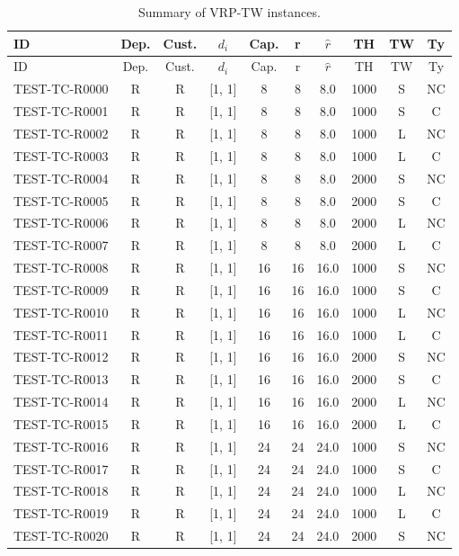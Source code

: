 \begin{longtable}{lccccccccc}
\caption{Summary of VRP-TW instances.} \\
\toprule
ID & Dep. & Cust. & $d_i$ & Cap. & r & $\hat{r}$ & TH & TW & Ty \\
\midrule
\endfirsthead
\toprule
ID & Dep. & Cust. & $d_i$ & Cap. & r & $\hat{r}$ & TH & TW & Ty \\
\midrule
\endhead
\bottomrule
\endfoot
\bottomrule
\endlastfoot
TEST-TC-R0000 & R & R & [1, 1] & 8 & 8 & 8.0 & 1000 & S & NC \\
TEST-TC-R0001 & R & R & [1, 1] & 8 & 8 & 8.0 & 1000 & S & C \\
TEST-TC-R0002 & R & R & [1, 1] & 8 & 8 & 8.0 & 1000 & L & NC \\
TEST-TC-R0003 & R & R & [1, 1] & 8 & 8 & 8.0 & 1000 & L & C \\
TEST-TC-R0004 & R & R & [1, 1] & 8 & 8 & 8.0 & 2000 & S & NC \\
TEST-TC-R0005 & R & R & [1, 1] & 8 & 8 & 8.0 & 2000 & S & C \\
TEST-TC-R0006 & R & R & [1, 1] & 8 & 8 & 8.0 & 2000 & L & NC \\
TEST-TC-R0007 & R & R & [1, 1] & 8 & 8 & 8.0 & 2000 & L & C \\
TEST-TC-R0008 & R & R & [1, 1] & 16 & 16 & 16.0 & 1000 & S & NC \\
TEST-TC-R0009 & R & R & [1, 1] & 16 & 16 & 16.0 & 1000 & S & C \\
TEST-TC-R0010 & R & R & [1, 1] & 16 & 16 & 16.0 & 1000 & L & NC \\
TEST-TC-R0011 & R & R & [1, 1] & 16 & 16 & 16.0 & 1000 & L & C \\
TEST-TC-R0012 & R & R & [1, 1] & 16 & 16 & 16.0 & 2000 & S & NC \\
TEST-TC-R0013 & R & R & [1, 1] & 16 & 16 & 16.0 & 2000 & S & C \\
TEST-TC-R0014 & R & R & [1, 1] & 16 & 16 & 16.0 & 2000 & L & NC \\
TEST-TC-R0015 & R & R & [1, 1] & 16 & 16 & 16.0 & 2000 & L & C \\
TEST-TC-R0016 & R & R & [1, 1] & 24 & 24 & 24.0 & 1000 & S & NC \\
TEST-TC-R0017 & R & R & [1, 1] & 24 & 24 & 24.0 & 1000 & S & C \\
TEST-TC-R0018 & R & R & [1, 1] & 24 & 24 & 24.0 & 1000 & L & NC \\
TEST-TC-R0019 & R & R & [1, 1] & 24 & 24 & 24.0 & 1000 & L & C \\
TEST-TC-R0020 & R & R & [1, 1] & 24 & 24 & 24.0 & 2000 & S & NC \\

\end{longtable}
